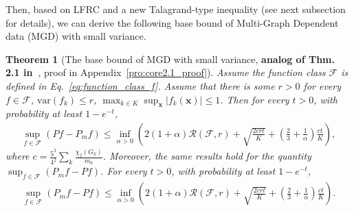 \documentclass{article}
\def\vx{{\mathbf{x}}}
\def\eE{\mathbb{E}}
\newtheorem{theorem}{Theorem}
\begin{document}
Then, based on LFRC and a new Talagrand-type inequality (see next subsection for details), we can derive the following base bound of Multi-Graph Dependent data (MGD) with small variance.
\begin{theorem}[The base bound of MGD with small variance, \textbf{analog of Thm. 2.1 in~\cite{Bartlett_2005}}, proof in Appendix~\ref{pro:core2.1_proof}] \label{thm:the core 2.1}
Assume the function class $\mathcal{F}$ is defined in Eq.~\eqref{eq:function_class_f}. 
Assume that there is some $r>0$ for every $f \in \mathcal{F}$, $\mathrm{var}(f_k) \leq r$, $\max_{k \in {K}} \sup_{\vx} |f_k(\vx)| \leq 1$.
Then for every $t > 0$, with probability at least $1-e^{-t}$, 
\begin{align*}
     \sup_{f \in \mathcal{F}} (P f - P_m f) 
     \leq \inf_{\alpha > 0} \left(2(1 + \alpha) \mathcal{R} (\mathcal{F} , r) + \sqrt {\frac{2crt}{K}} + (\frac{2}{3} + \frac{1}{\alpha})\frac{ct}{K} \right) ,
\end{align*}
where $c=\frac{5^2}{4^2} \sum_k \frac{\chi_f(G_k)}{m_k}$. Moreover, the same results hold for the quantity $\sup _{f \in \mathcal{F}} (P _m f - P f)$. For every $t> 0 $, with probability at least $1-e^{-t}$, 
\begin{align*}
    \sup _{f \in \mathcal{F}} (P _m f - P f) 
    \leq \inf_{\alpha > 0} \left(2(1 + \alpha) \mathcal{R} (\mathcal{F} , r) + \sqrt {\frac{2crt}{K}} + (\frac{2}{3} + \frac{1}{\alpha})\frac{ct}{K} \right) .
\end{align*}
\end{theorem}

\end{document}
